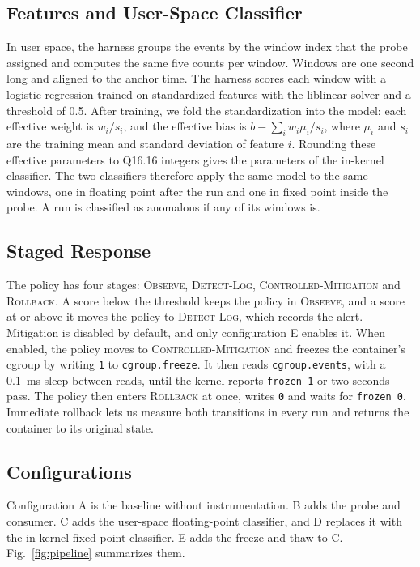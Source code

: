 \subsection{Features and User-Space Classifier}

In user space, the harness groups the events by the window index that the probe assigned and computes the same five counts per window. Windows are one second long and aligned to the anchor time. The harness scores each window with a logistic regression trained on standardized features with the liblinear solver and a threshold of 0.5. After training, we fold the standardization into the model: each effective weight is $w_i / s_i$, and the effective bias is $b - \sum_i w_i \mu_i / s_i$, where $\mu_i$ and $s_i$ are the training mean and standard deviation of feature $i$. Rounding these effective parameters to Q16.16 integers gives the parameters of the in-kernel classifier. The two classifiers therefore apply the same model to the same windows, one in floating point after the run and one in fixed point inside the probe. A run is classified as anomalous if any of its windows is.

\subsection{Staged Response}

The policy has four stages: \textsc{Observe}, \textsc{Detect-Log}, \textsc{Controlled-Mitigation} and \textsc{Rollback}. A score below the threshold keeps the policy in \textsc{Observe}, and a score at or above it moves the policy to \textsc{Detect-Log}, which records the alert. Mitigation is disabled by default, and only configuration E enables it. When enabled, the policy moves to \textsc{Controlled-Mitigation} and freezes the container's cgroup by writing \texttt{1} to \texttt{cgroup.freeze}. It then reads \texttt{cgroup.events}, with a 0.1~ms sleep between reads, until the kernel reports \texttt{frozen 1} or two seconds pass. The policy then enters \textsc{Rollback} at once, writes \texttt{0} and waits for \texttt{frozen 0}. Immediate rollback lets us measure both transitions in every run and returns the container to its original state.

\subsection{Configurations}

Configuration A is the baseline without instrumentation. B adds the probe and consumer. C adds the user-space floating-point classifier, and D replaces it with the in-kernel fixed-point classifier. E adds the freeze and thaw to C. Fig.~\ref{fig:pipeline} summarizes them.
